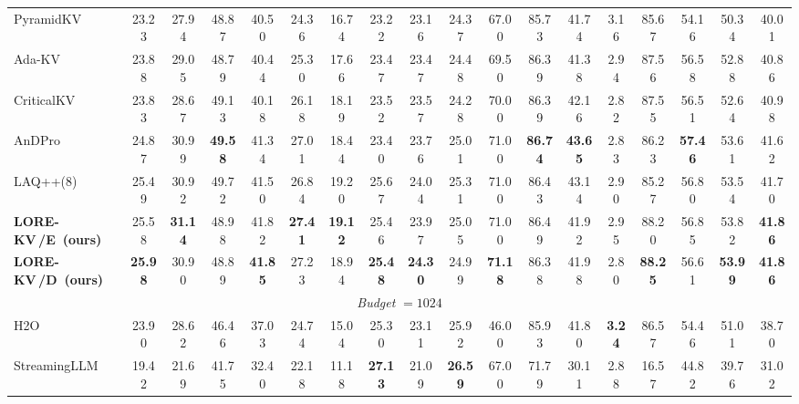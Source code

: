 \documentclass{article} %
\newcommand{\best}[1]{\textcolor{bestblue}{\textbf{#1}}}
\newcommand{\second}[1]{\textcolor{secondorange}{#1}}
\newcommand{\lorekvE}{LORE-KV\,/E}
\newcommand{\lorekvD}{LORE-KV\,/D}
\begin{document}
\begin{table}[t]
{\begin{tabular}{lccccccccccccccccc}
PyramidKV 
& 23.23 & 27.94 & 48.87 
& 40.50 & 24.36 & 16.74 
& 23.22 & 23.16 & 24.37 
& 67.00 & 85.73 & 41.74 
& \second{3.16} & 85.67 
& 54.16 & 50.34 
& 40.01 \\

Ada-KV 
& 23.88 & 29.05 & 48.79 
& 40.44 & 25.30 & 17.66 
& 23.47 & 23.47 & 24.48 
& 69.50 & 86.39 & 41.38 
& 2.94 & 87.56 
& 56.58 & 52.88 
& 40.86 \\

CriticalKV 
& 23.83 & 28.67 & \second{49.13} 
& 40.18 & 26.18 & 18.19 
& 23.52 & 23.57 & 24.28 
& 70.00 & 86.39 & \second{42.16} 
& 2.82 & 87.55 
& 56.51 & 52.64 
& 40.98 \\

AnDPro 
& 24.87 & \second{30.99} & \best{49.58} 
& 41.34 & 27.01 & 18.44 
& 23.40 & 23.76 & 25.01 
& \second{71.00} & \best{86.74} & \best{43.65} 
& 2.83 & 86.23 
& \best{57.46} & 53.61 
& \second{41.62} \\

LAQ++(8)
& 25.49 & 30.92 & 49.72 
& 41.50 & 26.84 & 19.20 
& 25.67 & 24.04 & 25.31 
& 71.00 & 86.43 & 43.14 
& 2.90 & 85.27 
& 56.80 & 53.54 
& 41.70 \\

\textbf{\lorekvE\ (ours)} 
& \second{25.58} & \best{31.14} & 48.98 
& \second{41.82} & \best{27.41} & \best{19.12} 
& \second{25.46} & \second{23.97} & \second{25.05} 
& \second{71.00} & \second{86.49} & 41.92 
& 2.95 & \second{88.20} 
& \second{56.85} & \second{53.82} 
& \best{41.86} \\

\textbf{\lorekvD\ (ours)} 
& \best{25.98} & 30.90 & 48.89 
& \best{41.85} & \second{27.23} & \second{18.94} 
& \best{25.48} & \best{24.30} & 24.99 
& \best{71.18} & 86.38 & 41.98 
& 2.80 & \best{88.25} 
& 56.61 & \best{53.99} 
& \best{41.86} \\

\midrule
\multicolumn{18}{c}{\textit{Budget} $=1024$} \\
\midrule

H2O 
& 23.90 & 28.62 & 46.46 
& 37.03 & 24.74 & 15.04 
& 25.30 & 23.11 & 25.92 
& 46.00 & 85.93 & 41.80 
& \best{3.24} & 86.57 
& 54.46 & 51.01 
& 38.70 \\

StreamingLLM 
& 19.42 & 21.69 & 41.75 
& 32.40 & 22.18 & 11.18 
& \best{27.13} & 21.09 & \best{26.59} 
& 67.00 & 71.79 & 30.11 
& 2.88 & 16.57 
& 44.82 & 39.76 
& 31.02 \\


\end{tabular}}
\end{table}
\end{document}
